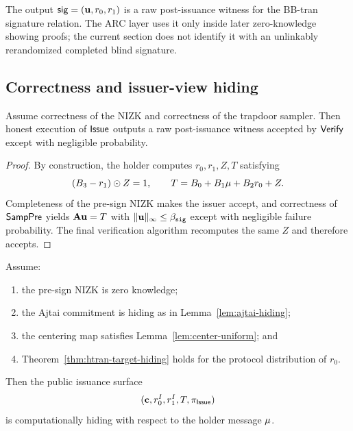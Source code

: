 The output $\mathsf{sig}=(\mathbf{u},r_0,r_1)$ is a raw post-issuance witness for the BB-tran signature relation.  The
ARC layer uses it only inside later zero-knowledge showing proofs; the current section does not identify it
with an unlinkably rerandomized completed blind signature.

\subsection{Correctness and issuer-view hiding}
\begin{proposition}[Correctness]\label{prop:bs-correctness-prop}
Assume correctness of the NIZK and correctness of the trapdoor sampler.  Then honest execution of
$\mathsf{Issue}$ outputs a raw post-issuance witness accepted by $\mathsf{Verify}$ except with negligible probability.
\end{proposition}

\begin{proof}
By construction, the holder computes $r_0,r_1,Z,T$ satisfying
\[
  (B_3-r_1)\odot Z=1,
  \qquad
  T=B_0+B_1\mathbf{\mu}+B_2r_0+Z.
\]
Completeness of the pre-sign NIZK makes the issuer accept, and correctness of $\mathsf{SampPre}$ yields
$\mathbf{A}\mathbf{u}=T$ with $\|\mathbf{u}\|_\infty\le \beta_{\mathtt{sig}}$ except with negligible failure probability.  The final
verification algorithm recomputes the same $Z$ and therefore accepts.
\end{proof}

\begin{proposition}\label{prop:bs-issuer-view-hiding}
Assume:
\begin{enumerate}[leftmargin=1.25em]
  \item the pre-sign NIZK is zero knowledge;
  \item the Ajtai commitment is hiding as in Lemma~\ref{lem:ajtai-hiding};
  \item the centering map satisfies Lemma~\ref{lem:center-uniform}; and
  \item Theorem~\ref{thm:htran-target-hiding} holds for the protocol distribution of $r_0$.
\end{enumerate}
Then the public issuance surface
\[
  (\mathbf{c},r_0^I,r_1^I,T,\pi_{\mathsf{Issue}})
\]
is computationally hiding with respect to the holder message $\mathbf{\mu}$.
\end{proposition}

